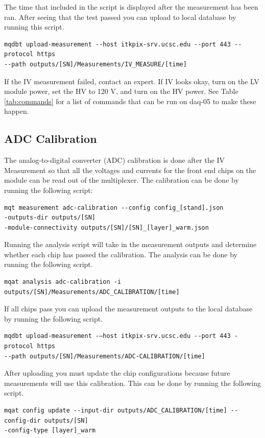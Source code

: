 \documentclass[12pt]{article}
\begin{document}
The time that included in the script is displayed after the measurement has been ran. After seeing that the test passed you can upload to local database by running this script. 

\begin{verbatim}
mqdbt upload-measurement --host itkpix-srv.ucsc.edu --port 443 --protocol https
--path outputs/[SN]/Measurements/IV_MEASURE/[time]
\end{verbatim}
If the IV measurement failed, contact an expert. If IV looks okay, turn on the LV module power, set the HV to 120 V, and turn on the HV power. See Table \ref{tab:commands} for a list of commands that can be run on daq-05 to make these happen.  


\subsection{ADC Calibration}

The analog-to-digital converter (ADC) calibration is done after the IV Measurement so that all the voltages and currents for the front end chips on the module can be read out of the multiplexer. The calibration can be done by running the following script:
\begin{verbatim}
mqt measurement adc-calibration --config config_[stand].json 
-outputs-dir outputs/[SN]
-module-connectivity outputs/[SN]/[SN]_[layer]_warm.json
\end{verbatim}


Running the analysis script will take in the measurement outputs and determine whether each chip has passed the calibration. The analysis can be done by running the following script. 

\begin{verbatim}
mqat analysis adc-calibration -i outputs/[SN]/Measurements/ADC_CALIBRATION/[time]
\end{verbatim}
If all chips pass you can upload the measurement outputs to the local database by running the following script. 
\begin{verbatim}
mqdbt upload-measurement -–host itkpix-srv.ucsc.edu --port 443 -protocol https
--path outputs/[SN]/Measurements/ADC-CALIBRATION/[time]
\end{verbatim}
After uploading you must update the chip configurations because future measurements will use this calibration. This can be done by running the following script. 
\begin{verbatim}
mqat config update --input-dir outputs/ADC_CALIBRATION/[time] --config-dir outputs/[SN] 
-config-type [layer]_warm
\end{verbatim}
\end{document}
